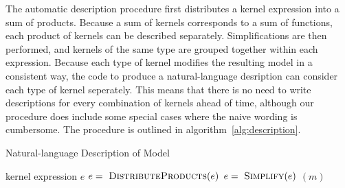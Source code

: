 \documentclass{article}
\begin{document}
The automatic description procedure first distributes a kernel expression into a sum of products.
Because a sum of kernels corresponds to a sum of functions, each product of kernels can be described separately.
Simplifications are then performed, and kernels of the same type are grouped together within each expression.
Because each type of kernel modifies the resulting model in a consistent way, the code to produce a natural-language desription can consider each type of kernel seperately.  This means that there is no need to write descriptions for every combination of kernels ahead of time, although our procedure does include some special cases where the naive wording is cumbersome.
The procedure is outlined in algorithm~\ref{alg:description}.




\begin{algorithm}[tb]
   \caption{Natural-language Description of Model}
   \label{alg:description}
\begin{algorithmic}
    kernel expression $e$
   \STATE $e = {\textnormal{ \sc DistributeProducts}}(e)$
   \STATE $e = {\textnormal{ \sc Simplify}}(e)$
             $(m)$
       \ENDFOR
   \ENDFOR
\end{algorithmic}
\end{algorithm}
\end{document}

